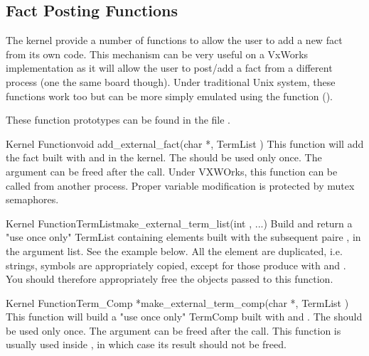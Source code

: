 \subsection{Fact Posting Functions}

The kernel provide a number of functions to allow the user to add a new fact
from its own code. This mechanism can be very useful on a VxWorks
implementation as it will allow the user to post/add a fact from a different
process (one the same board though). Under traditional Unix system, these
functions work too but can be more simply emulated using the
 function ().


These function prototypes can be found in the file
.

\begin{typefn}{Kernel Function}{void }{add\_external\_fact}{(char *, TermList
)} This function will add the fact built with 
and  in the  kernel. The 
should be used only once. The  argument can be freed after the
call. Under VXWOrks, this function can be called from another process. Proper
variable modification is protected by mutex semaphores.
\end{typefn}

\begin{typefn}{Kernel Function}{TermList}{make\_external\_term\_list}{(int ,
...)}  Build and return a "use once only" TermList containing 
elements built with the subsequent paire ,  in the
argument list. See the example below. All the element are duplicated,
i.e. strings, symbols are appropriately copied, except for those produce with
 and . You should
therefore appropriately free the objects passed to this function.
\end{typefn}

\begin{typefn}{Kernel Function}{Term\_Comp *}{make\_external\_term\_comp}{(char
*, TermList )} This function will build a "use
once only" TermComp built with  and . The
 should be used only once. The  argument can be
freed after the call. This function is usually used inside
, in which case its result should not be freed.
\end{typefn}

